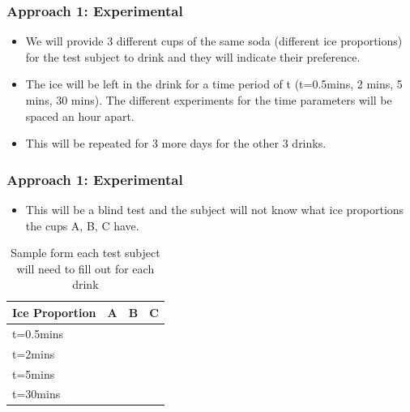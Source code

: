 \documentclass[compress,handout,10pt]{beamer}
\let\olditem\item
\renewcommand{\item}{\setlength{\itemsep}{0.5\baselineskip}\olditem}
\begin{document}
\begin{frame}
    \frametitle{Approach 1: Experimental}

\begin {itemize}

\item We will provide 3 different cups of the same soda (different ice proportions) for the test subject to drink and they will indicate their preference. 
\item The ice will be left in the drink for a time period of t (t=0.5mins, 2 mins, 5 mins, 30 mins). The different experiments for the time parameters will be spaced an hour apart.
\item This will be repeated for 3 more days for the other 3 drinks.
\end{itemize}
\end{frame}

\begin{frame}
    \frametitle{Approach 1: Experimental}

\begin {itemize}

\item This will be a blind test and the subject will not know what ice proportions the cups A, B, C have.
\end{itemize}
\vspace{6pt}

\begin{table}[ h]
\centering
\begin{tabular}{ l | c|c|c }
  Ice Proportion & A  & B & C  \\
\hline  
t=0.5mins & & &\\ 
\hline  
t=2mins & & &\\ 
\hline  
t=5mins  & & &\\ 
\hline  
t=30mins & & &\\ 
\hline  
   
 \end{tabular}
\caption{Sample form each test subject will need to fill out for each drink}

\end{table}

\end{frame}
\end{document}
